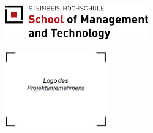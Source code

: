 \hypersetup{pageanchor=false}
\begin{titlepage}
\begin{figure}[htbp]
  \begin{minipage}[t][2cm][c]{\textwidth/2+1.7cm}
	
		\includegraphics[height=4em]{_includes/images/scmt-logo.png}  

  \end{minipage}
  \begin{minipage}[t][3cm][c]{\textwidth/2-1.7cm}
	\begin{flushright}
	\end{flushright}
  \end{minipage}
\end{figure}



\vspace{3em}
\begin{center}
	\large{\textsf{\SCMTtype}}
\end{center}

\vspace{2em}
\begin{figure}[htbp]
\centering
\includegraphics[height=9em]{_includes/images/some-company-logo.png}
\end{figure}

\begin{center}
\vspace{2em}
\Huge{\textbf{\textsf{\SCMTtitle}}}


\large{\emph{\textsf{\SCMTsubtitle\SCMTstudyprogramlarge}}}
\vspace{\fill}
\end{center}


\end{titlepage}
